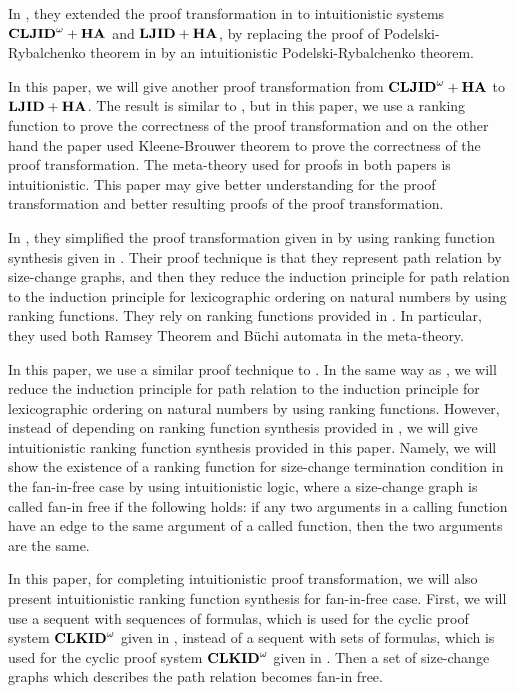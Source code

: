 In \cite{Berardi18},
they extended
the proof transformation in \cite{Berardi17a}
to intuitionistic systems ${{\bf CLJID}^\omega+{\bf HA}}$ and ${{\bf LJID}+{\bf HA}}$,
by replacing the proof of Podelski-Rybalchenko theorem in  \cite{Berardi17a}
by an intuitionistic Podelski-Rybalchenko theorem.

In this paper,
we will give
another proof transformation from ${{\bf CLJID}^\omega+{\bf HA}}$ to ${{\bf LJID}+{\bf HA}}$.
The result is similar to \cite{Berardi18},
but in this paper,
we use a ranking function
to prove the correctness of the proof transformation
and on the other hand
the paper \cite{Berardi18} used 
Kleene-Brouwer theorem
to prove the correctness of the proof transformation.
The meta-theory used for proofs in both papers is
intuitionistic.
This paper may give better understanding for the proof transformation
and better resulting proofs of the proof transformation.

In \cite{Ikebuchi25},
they simplified the proof transformation given in \cite{Berardi17a}
by using ranking function synthesis given in \cite{Lee09}.
Their proof technique is that
they represent path relation by size-change graphs,
and then
they reduce
the induction principle for path relation
to the induction principle for lexicographic ordering on natural numbers
by using ranking functions.
They rely on ranking functions provided in \cite{Lee09}.
In particular, 
they used both Ramsey Theorem and B\"uchi automata in the meta-theory.

In this paper,
we use a similar proof technique to \cite{Ikebuchi25}.
In the same way as \cite{Ikebuchi25},
we will reduce
the induction principle for path relation
to the induction principle for lexicographic ordering on natural numbers
by using ranking functions.
However, instead of depending on 
ranking function synthesis provided in \cite{Lee09},
we will give intuitionistic 
ranking function synthesis provided in this paper.
Namely, we will show
the existence of a ranking function for size-change termination condition
in the fan-in-free case by using intuitionistic logic,
where a size-change graph is called fan-in free \cite{Benamram09} if
the following holds:
if any two arguments in a calling function have an edge to the same
argument of a called function, then the two arguments are the same.

In this paper,
for completing intuitionistic proof transformation,
we will also present intuitionistic ranking function synthesis
for fan-in-free case.
First, we will use a sequent with sequences of formulas,
which is used for the cyclic proof system ${{\bf CLKID}^\omega}$ given in 
\cite{Brotherston06},
instead of a sequent with sets of formulas,
which is used for the cyclic proof system ${{\bf CLKID}^\omega}$ given in 
\cite{Brotherston11}.
Then a set of size-change graphs 
which describes the path relation becomes fan-in free.

